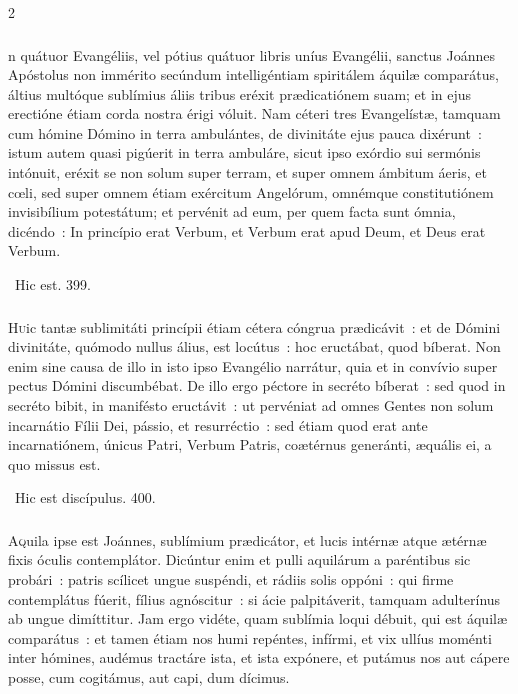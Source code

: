 \documentclass[9pt,twoside]{extarticle}
\begin{document}
\begin{multicols}{2}
\subsubsection*{\center {}}
n quátuor Evangéliis, vel pótius quátuor libris uníus Evangélii, sanctus Joánnes Apóstolus non immérito secúndum intelligéntiam spiritálem áquilæ comparátus, áltius multóque sublímius áliis tribus eréxit prædicatiónem suam; et in ejus erectióne étiam corda nostra érigi vóluit. Nam céteri tres Evangelístæ, tamquam cum hómine Dómino in terra ambulántes, de divinitáte ejus pauca dixérunt~: istum autem quasi pigúerit in terra ambuláre, sicut ipso exórdio sui sermónis intónuit, eréxit se non solum super terram, et super omnem ámbitum áeris, et cœli, sed super omnem étiam exércitum Angelórum, omnémque constitutiónem invisibílium potestátum; et pervénit ad eum, per quem facta sunt ómnia, dicéndo~: In princípio erat Verbum, et Verbum erat apud Deum, et Deus erat Verbum.

\begin{tightlist}{}
\item {}~Hic est. 399.
\end{tightlist}

\subsubsection*{\center {}}
\lettrine{H}uic tantæ sublimitáti princípii étiam cétera cóngrua prædicávit~: et de Dómini divinitáte, quómodo nullus álius, est locútus~: hoc eructábat, quod bíberat. Non enim sine causa de illo in isto ipso Evangélio narrátur, quia et in convívio super pectus Dómini discumbébat. De illo ergo péctore in secréto bíberat~: sed quod in secréto bibit, in manifésto eructávit~: ut pervéniat ad omnes Gentes non solum incarnátio Fílii Dei, pássio, et resurréctio~: sed étiam quod erat ante incarnatiónem, únicus Patri, Verbum Patris, coætérnus generánti, æquális ei, a quo missus est.

\begin{tightlist}{}
\item {}~Hic est discípulus. 400.
\end{tightlist}

\subsubsection*{\center {}}
\lettrine{A}quila ipse est Joánnes, sublímium prædicátor, et lucis intérnæ atque ætérnæ fixis óculis contemplátor. Dicúntur enim et pulli aquilárum a paréntibus sic probári~: patris scílicet ungue suspéndi, et rádiis solis oppóni~: qui firme contemplátus fúerit, fílius agnóscitur~: si ácie palpitáverit, tamquam adulterínus ab ungue dimíttitur. Jam ergo vidéte, quam sublímia loqui débuit, qui est áquilæ comparátus~: et tamen étiam nos humi repéntes, infírmi, et vix ullíus moménti inter hómines, audémus tractáre ista, et ista expónere, et putámus nos aut cápere posse, cum cogitámus, aut capi, dum dícimus.


\end{multicols}
\end{document}
